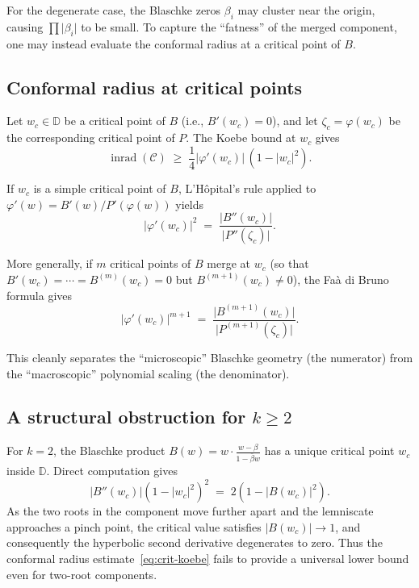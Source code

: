 \documentclass[11pt,a4paper]{amsart}
\theoremstyle{definition}
\newcommand{\D}{\mathbb{D}}
\newcommand{\abs}[1]{\lvert #1 \rvert}
\newcommand{\inrad}{\operatorname{inrad}}
\begin{document}
For the degenerate case, the Blaschke zeros $\beta_i$ may cluster
near the origin, causing $\prod\abs{\beta_i}$ to be small.
To capture the ``fatness'' of the merged component, one may instead
evaluate the conformal radius at a critical point of $B$.

\subsection{Conformal radius at critical points}

Let $w_c \in \D$ be a critical point of $B$ (i.e., $B'(w_c) = 0$),
and let $\zeta_c = \varphi(w_c)$ be the corresponding critical point
of $P$.  The Koebe bound at $w_c$ gives
\begin{equation}\label{eq:crit-koebe}
  \inrad(\mathcal{C}) \;\geq\;
  \frac{1}{4}\abs{\varphi'(w_c)}\,(1 - \abs{w_c}^2).
\end{equation}

If $w_c$ is a simple critical point of $B$, L'H\^{o}pital's rule applied
to $\varphi'(w) = B'(w)/P'(\varphi(w))$ yields
\begin{equation}\label{eq:lhopital}
  \abs{\varphi'(w_c)}^2 \;=\;
  \frac{\abs{B''(w_c)}}{\abs{P''(\zeta_c)}}.
\end{equation}

More generally, if $m$ critical points of $B$ merge at $w_c$
(so that $B'(w_c) = \cdots = B^{(m)}(w_c) = 0$ but
$B^{(m+1)}(w_c) \neq 0$), the Fa\`{a} di Bruno formula gives
\begin{equation}\label{eq:faa-di-bruno}
  \abs{\varphi'(w_c)}^{m+1} \;=\;
  \frac{\abs{B^{(m+1)}(w_c)}}{\abs{P^{(m+1)}(\zeta_c)}}.
\end{equation}

This cleanly separates the ``microscopic'' Blaschke geometry (the
numerator) from the ``macroscopic'' polynomial scaling (the denominator).

\subsection{A structural obstruction for $k \geq 2$}
\label{sec:obstruction}

For $k = 2$, the Blaschke product $B(w) = w \cdot \frac{w-\beta}{1-\bar\beta w}$
has a unique critical point $w_c$ inside $\D$.  Direct computation gives
\begin{equation}\label{eq:k2-identity}
  \abs{B''(w_c)}(1-\abs{w_c}^2)^2 \;=\; 2(1 - \abs{B(w_c)}^2).
\end{equation}
As the two roots in the component move further apart and the lemniscate
approaches a pinch point, the critical value satisfies $\abs{B(w_c)} \to 1$,
and consequently the hyperbolic second derivative degenerates to zero.
Thus the conformal radius estimate~\eqref{eq:crit-koebe} fails to provide
a universal lower bound even for two-root components.
\end{document}
